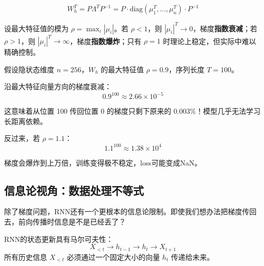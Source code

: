 \begin{equation}
    W_h^T = P \Lambda^T P^{-1} = P \cdot \text{diag}(\mu_1^T, \ldots, \mu_n^T) \cdot P^{-1}
\end{equation}

设最大特征值的模为 $\rho = \max_i |\mu_i|$。若 $\rho < 1$，则 $|\mu_i|^T \to 0$，梯度\textbf{指数衰减}；若 $\rho > 1$，则 $|\mu_i|^T \to \infty$，梯度\textbf{指数爆炸}；只有 $\rho = 1$ 时理论上稳定，但实际中难以精确控制。

\begin{example}[梯度消失的数值演示]
假设隐状态维度 $n = 256$，$W_h$ 的最大特征值 $\rho = 0.9$，序列长度 $T = 100$。

沿最大特征向量方向的梯度衰减：
\begin{equation}
    0.9^{100} \approx 2.66 \times 10^{-5}
\end{equation}

这意味着从位置 100 传回位置 0 的梯度只剩下原来的 $0.003\%$！模型几乎无法学习长距离依赖。

反过来，若 $\rho = 1.1$：
\begin{equation}
    1.1^{100} \approx 1.38 \times 10^{4}
\end{equation}

梯度会爆炸到上万倍，训练变得极不稳定，loss可能变成NaN。
\end{example}



\subsection{信息论视角：数据处理不等式}

除了梯度问题，RNN还有一个更根本的信息论限制。即使我们想办法把梯度传回去，前向传播时信息是不是已经丢了？

\begin{keyidea}[RNN的信息瓶颈]
RNN的状态更新具有马尔可夫性：
\begin{equation}
    X_{<t} \to h_{t-1} \to h_t \to X_{t+1}
\end{equation}
所有历史信息 $X_{<t}$ 必须通过一个固定大小的向量 $h_t$ 传递给未来。
\end{keyidea}

